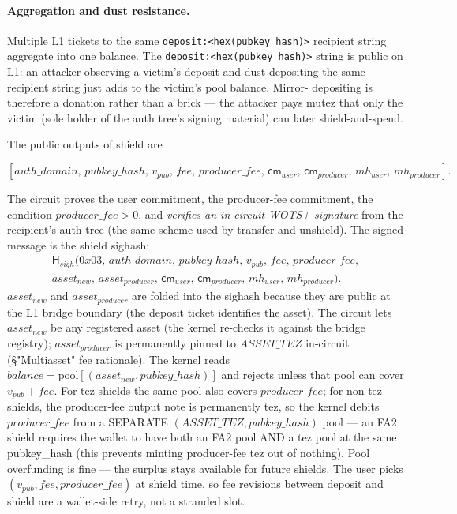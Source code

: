 \documentclass[11pt]{article}
\newcommand{\Hash}{\mathsf{H}}
\newcommand{\cm}{\mathsf{cm}}
\newcommand{\depositkey}{\texttt{deposit:}\allowbreak\texttt{<hex(}\allowbreak\texttt{pubkey\_hash}\allowbreak\texttt{)>}}
\begin{document}
\paragraph{Aggregation and dust resistance.} Multiple L1 tickets to the
same \depositkey{} recipient string aggregate into
one balance. The \depositkey{} string is public on
L1: an attacker observing a victim's deposit and dust-depositing the
same recipient string just adds to the victim's pool balance. Mirror-
depositing is therefore a donation rather than a brick — the attacker pays
mutez that only the victim (sole holder of the auth tree's signing
material) can later shield-and-spend.

The public outputs of shield are

\[
[auth\_domain,\, pubkey\_hash,\, v_{pub},\, fee,\, producer\_fee,\, \cm_{user},\, \cm_{producer},\,
 mh_{user},\, mh_{producer}].
\]

The circuit proves the user commitment, the producer-fee commitment, the
condition \(producer\_fee > 0\), and \emph{verifies an in-circuit WOTS+
signature} from the recipient's auth tree (the same scheme used by
transfer and unshield). The signed message is the shield sighash:
\begin{multline*}
\Hash_{sigh}(0x03,\, auth\_domain,\, pubkey\_hash,\, v_{pub},\, fee,\, producer\_fee,\\
              asset_{new},\, asset_{producer},\,
              \cm_{user},\, \cm_{producer},\, mh_{user},\, mh_{producer}).
\end{multline*}
\(asset_{new}\) and \(asset_{producer}\) are folded into the sighash
because they are public at the L1 bridge boundary (the deposit ticket
identifies the asset). The circuit lets \(asset_{new}\) be any
registered asset (the kernel re-checks it against the bridge
registry); \(asset_{producer}\) is permanently pinned to
\(ASSET\_TEZ\) in-circuit (§"Multiasset" fee rationale).
The kernel reads
\(balance = \mathrm{pool}[(asset_{new}, pubkey\_hash)]\) and rejects
unless that pool can cover \(v_{pub} + fee\). For tez shields the
same pool also covers \(producer\_fee\); for non-tez shields, the
producer-fee output note is permanently tez, so the kernel debits
\(producer\_fee\) from a SEPARATE
\((ASSET\_TEZ, pubkey\_hash)\) pool — an FA2 shield requires the
wallet to have both an FA2 pool AND a tez pool at the same
pubkey\_hash (this prevents minting producer-fee tez out of
nothing). Pool overfunding is fine — the surplus stays available
for future shields. The user picks \((v_{pub}, fee, producer\_fee)\)
at shield time, so fee revisions between deposit and shield are a
wallet-side retry, not a stranded slot.
\end{document}
